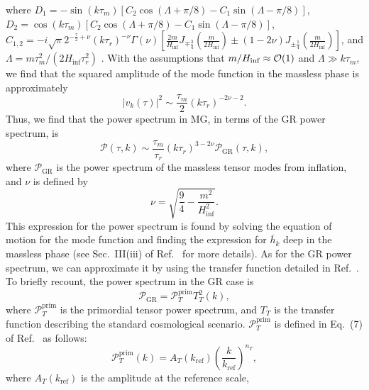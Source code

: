 \documentclass[prd,twocolumn,aps,psfig,nofootinbib,nobibnotes,superscriptaddress,preprintnumbers,times]{revtex4-2}
\begin{document}
where $D_1 = -\sin(k\tau_m)[C_2\cos(\Lambda + \pi/8) - C_1 \sin(\Lambda -\pi/8)]$, $D_2 = \cos(k\tau_m)[C_2\cos(\Lambda + \pi/8) - C_1 \sin(\Lambda -\pi/8)]$, $C_{1,2} = -i\sqrt{\pi} 2^{-\frac{\tau}{2}+\nu}(k\tau_r)^{-\nu}\Gamma(\nu)[\frac{2m}{H_{\inf}}J_{\mp \frac{3}{4}}(\frac{m}{2H_{\inf}})\pm (1-2\nu)J_{\pm \frac{1}{4}}(\frac{m}{2H_{\inf}}) ] $, and $\Lambda = m\tau_m^2/(2H_{\inf}\tau_r^2)$ \cite{Fujita:2018ehq}. With the assumptions that $m/H_{\rm inf} \approx \mathcal{O}(1)$ and $\Lambda \gg k\tau_m$, we find that the squared amplitude of the mode function in the massless phase is approximately 
\begin{equation}\label{eqn:mode_squared}
    |v_k(\tau)|^2 \sim \frac{\tau_m}{2}(k \tau_r)^{-2\nu - 2}.
\end{equation}
Thus, we find that the power spectrum in MG, in terms of the GR power spectrum, is 
\begin{equation}\label{eqn:p_sfm}
    \mathcal{P}(\tau, k) \sim \frac{\tau_m}{\tau_r}(k\tau_r)^{3-2\nu}\mathcal{P}_{\text{GR}}(\tau,k), 
\end{equation}
where $\mathcal{P}_{\text{GR}}$ is the power spectrum of the massless tensor modes from inflation, and $\nu$ is defined by 
\begin{equation}\label{eqn:nu}
    \nu = \sqrt{\frac{9}{4} - \frac{m^2}{H_{\inf}^2}}.
\end{equation}
This expression for the power spectrum is found by solving the equation of motion for the mode function and finding the expression for $\bar{h}_k$ deep in the massless phase (see Sec.\ III(iii) of Ref.\ \cite{Fujita:2018ehq} for more details). As for the GR power spectrum, we can approximate it by using the transfer function detailed in Ref.\ \cite{Kuroyanagi:2014nba}. To briefly recount, the power spectrum in the GR case is 
\begin{equation}\label{eqn:p_gr_sfm}
    \mathcal{P}_{\text{GR}} = \mathcal{P}^{\text{prim}}_{T} T^2_T(k),
\end{equation}
where $\mathcal{P}^{\text{prim}}_{T}$ is the primordial tensor power spectrum, and $T_{T}$ is the transfer function describing the standard cosmological scenario. $\mathcal{P}^{\text{prim}}_{T}$ is defined in Eq.\ (7) of Ref.\ \cite{Kuroyanagi:2014nba} as follows:
\begin{equation}\label{eqn:pt}
    \mathcal{P}_{T}^{\text{prim}}(k) = A_T(k_{\text{ref}})\left(\frac{k}{k_{\text{ref}}}\right)^{n_T},
\end{equation}
where $A_T(k_{\text{ref}})$ is the amplitude at the reference scale,
\end{document}

